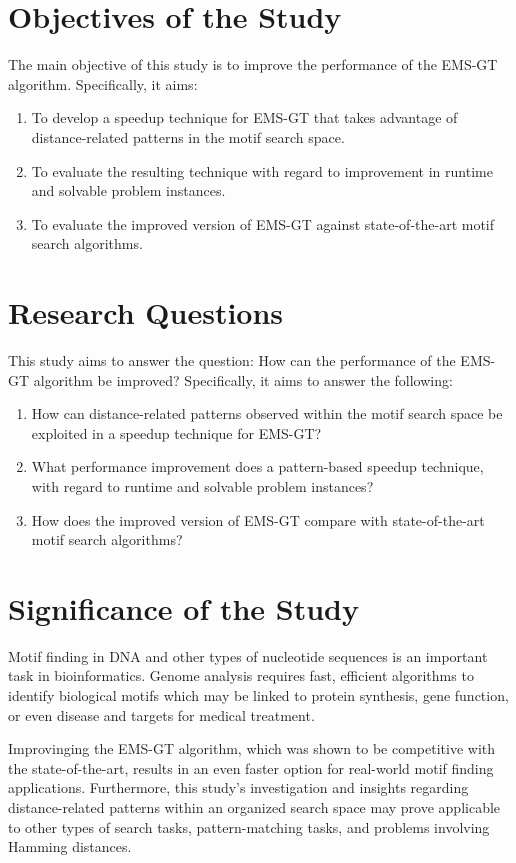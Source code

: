 \documentclass[oneside,12pt]{DISCSthesis}
\begin{document}
	\section{Objectives of the Study}
		The main objective of this study is to improve the performance of the EMS-GT algorithm. Specifically, it aims:
		\begin{enumerate}
		\item To develop a speedup technique for EMS-GT that takes advantage of distance-related patterns in the motif search space.
		\item To evaluate the resulting technique with regard to improvement in runtime and solvable problem instances.
		\item To evaluate the improved version of EMS-GT against state-of-the-art motif search algorithms.
		\end{enumerate}

	\section{Research Questions}
		This study aims to answer the question: How can the performance of the EMS-GT algorithm be improved?
		Specifically, it aims to answer the following:

		\begin{enumerate}
		\item How can distance-related patterns observed within the motif search space be exploited in a speedup technique for EMS-GT?
		\item What performance improvement does a pattern-based speedup technique, with regard to runtime and solvable problem instances?
		\item How does the improved version of EMS-GT compare with state-of-the-art motif search algorithms?
		\end{enumerate}

	\section{Significance of the Study}
		Motif finding in DNA and other types of nucleotide sequences is an important task in bioinformatics. Genome analysis requires fast, efficient algorithms to identify biological motifs which may be linked to protein synthesis, gene function, or even disease and targets for medical treatment. 

		Improvinging the EMS-GT algorithm, which was shown to be competitive with the state-of-the-art, results in an even faster option for real-world motif finding applications. Furthermore, this study's investigation and insights regarding distance-related patterns within an organized search space may prove applicable to other types of search tasks, pattern-matching tasks, and problems involving Hamming distances.
\end{document}
